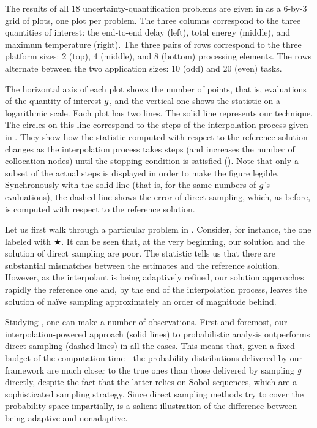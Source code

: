 
The results of all 18 uncertainty-quantification problems are given in
 as a 6-by-3 grid of plots, one plot per problem. The three
columns correspond to the three quantities of interest: the end-to-end delay
(left), total energy (middle), and maximum temperature (right). The three pairs
of rows correspond to the three platform sizes: 2 (top), 4 (middle), and 8
(bottom) processing elements. The rows alternate between the two application
sizes: 10 (odd) and 20 (even) tasks.

The horizontal axis of each plot shows the number of points, that is,
evaluations of the quantity of interest $g$, and the vertical one shows the
 statistic on a logarithmic scale. Each plot has two lines. The solid
line represents our technique. The circles on this line correspond to the steps
of the interpolation process given in . They show how the
 statistic computed with respect to the reference solution changes as the
interpolation process takes steps (and increases the number of collocation
nodes) until the stopping condition is satisfied (). Note that
only a subset of the actual steps is displayed in order to make the figure
legible. Synchronously with the solid line (that is, for the same numbers of
$g$'s evaluations), the dashed line shows the error of direct sampling, which,
as before, is computed with respect to the reference solution.

Let us first walk through a particular problem in . Consider, for
instance, the one labeled with $\bigstar$. It can be seen that, at the very
beginning, our solution and the solution of direct sampling are poor. The
 statistic tells us that there are substantial mismatches between the
estimates and the reference solution. However, as the interpolant is being
adaptively refined, our solution approaches rapidly the reference one and, by
the end of the interpolation process, leaves the solution of na\"{i}ve sampling
approximately an order of magnitude behind.

Studying , one can make a number of observations. First and
foremost, our interpolation-powered approach (solid lines) to probabilistic
analysis outperforms direct sampling (dashed lines) in all the cases. This means
that, given a fixed budget of the computation time---the probability
distributions delivered by our framework are much closer to the true ones than
those delivered by sampling $g$ directly, despite the fact that the latter
relies on Sobol sequences, which are a sophisticated sampling strategy. Since
direct sampling methods try to cover the probability space impartially,
 is a salient illustration of the difference between being
adaptive and nonadaptive.

